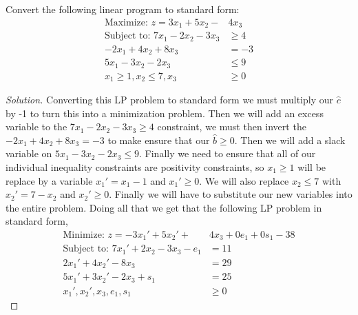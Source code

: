 \documentclass[12pt]{article}
\makeatletter
\theoremstyle{homework}
\newenvironment{exercise}[1]
{\def\@currentlabel{#1}\exercisecore}
{\endexercisecore}
\makeatother
\begin{document}
\begin{exercise}{2.1} Convert the following linear program to standard form:
  \begin{align*}
    \text{Maximize: } z = 3x_1 + 5x_2 - &4x_3\\
    \text{Subject to: } 7x_1 - 2x_2 - 3x_3 &\geq 4\\
    -2x_1  + 4x_2 + 8x_3  &=  -3\\
    5x_1  -3x_2 -2 x_3  &\leq 9\\
    x_1 \geq 1, x_2 \leq 7, x_3 &\geq 0
  \end{align*}
  \begin{proof}[Solution] Converting this LP problem to standard form we 
    must multiply our $\hat{c}$ by -1 to turn this into a minimization problem. 
    Then we will add an excess variable to the  $7x_1 - 2x_2 - 3x_3 \geq 4$ constraint, we must 
    then invert the $-2x_1  + 4x_2 + 8x_3  =  -3$ to make ensure that our $\hat{b} \geq 0$. Then we will 
    add a slack variable on $5x_1  -3x_2 -2 x_3  \leq 9$. Finally we need to ensure that all of our individual 
    inequality constraints are positivity constraints, so $x_1 \geq 1$ will be replace by a variable $x_1' = x_1 - 1$ 
    and $x_1' \geq 0$. We will also replace $x_2 \leq 7$ with $x_2' = 7 - x_2$ and $x_2' \geq 0$. Finally we will 
    have to substitute our new variables into the entire problem. Doing all that we get that the following LP problem 
    in standard form, 
    \begin{align*}
      \text{Minimize: } z = -3x_1' + 5x_2' + &4x_3 + 0e_1 + 0s_1 - 38\\
      \text{Subject to: } 7x_1' + 2x_2 - 3x_3 - e_1 &= 11\\
      2x_1'  + 4x_2' - 8x_3  &=  29\\
      5x_1'  +3x_2' -2x_3 + s_1  &=  25\\
      x_1', x_2', x_3, e_1, s_1 &\geq 0
        \end{align*}
 \end{proof}
\end{exercise}
\vspace{.5in}
\end{document}
